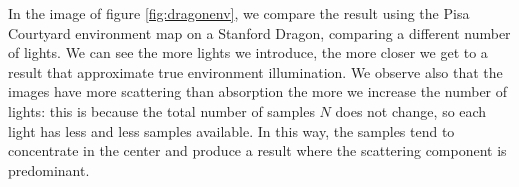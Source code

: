 \clearpage
In the image of figure \ref{fig:dragonenv}, we compare the result using the Pisa Courtyard environment map on a Stanford Dragon, comparing a different number of lights. We can see the more lights we introduce, the more closer we get to a result that approximate true environment illumination. We observe also that the images have more scattering than absorption the more we increase the number of lights: this is because the total number of samples $N$ does not change, so each light has less and less samples available. In this way, the samples tend to concentrate in the center and produce a result where the scattering component is predominant.
\begin{figure}[!h]
\vspace{-0.5cm}
\centering
{}
 \\


\end{figure}

